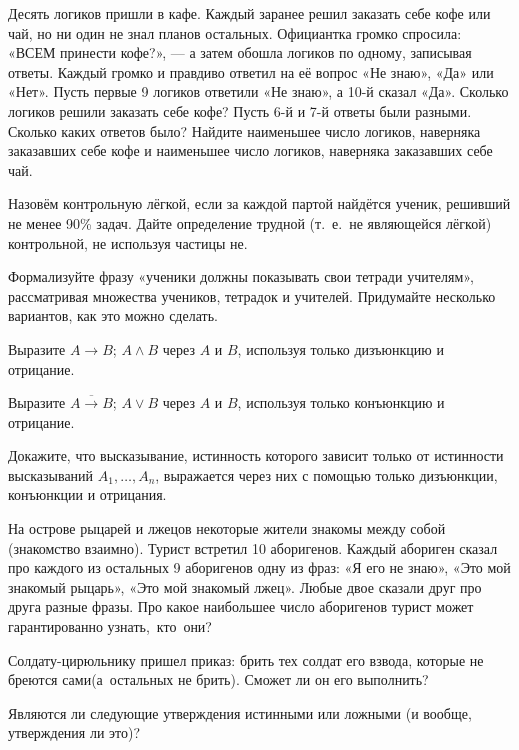 \documentclass[a4paper,11pt]{article}
\newcommand{\0}[1]{\overline{#1}}
\begin{document}
Десять логиков пришли в кафе. Каждый заранее решил заказать себе кофе или чай, но ни один не знал
планов остальных. Официантка громко спросила: «ВСЕМ принести кофе?», --- а затем обошла логиков по одному, записывая ответы.
Каждый громко и правдиво ответил на её вопрос «Не знаю», «Да» или «Нет».
 Пусть первые 9 логиков ответили «Не знаю»,
а 10-й сказал «Да». Сколько логиков решили заказать себе кофе?
 Пусть 6-й и 7-й ответы были разными. Сколько каких ответов было? Найдите наименьшее
число логиков, наверняка заказавших себе кофе и наименьшее число логиков, наверняка заказавших себе чай.

Назов\"ем контрольную л\"егкой, если за каждой партой найд\"ется
ученик, решивший не менее 90\% задач. Дайте определение
трудной (т.~е.~не являющейся л\"егкой) контрольной, не используя
частицы  не.


 Формализуйте фразу «ученики должны показывать свои тетради учителям», рассматривая множества учеников, тетрадок и учителей. Придумайте несколько вариантов, как это можно сделать.

Выразите
$A\to B$;
$A\wedge B$ через $A$ и $B$, используя только дизъюнкцию и отрицание.

Выразите
$\overline{A\to B}$;
$A\vee B$ через $A$ и $B$, используя только конъюнкцию и отрицание.

Докажите, что %
высказывание, истинность которого зависит
только от истинности высказываний $A_1,\dots,A_n$,
выражается через них с помощью %
только дизъюнкции, конъюнкции и отрицания.


На острове рыцарей и лжецов некоторые жители знакомы между собой (знакомство взаимно). Турист встретил 10 аборигенов. Каждый абориген сказал про каждого из остальных 9 аборигенов одну из фраз: «Я его не знаю», «Это мой знакомый рыцарь», «Это мой знакомый лжец». Любые двое сказали друг про друга разные фразы. Про какое наибольшее число аборигенов турист может гарантированно узнать,~кто~они?

Солдату-цирюльнику пришел приказ: брить тех солдат его взвода,
которые не бреются сами\break (а~остальных не брить). Сможет ли он его выполнить?

 Являются ли следующие утверждения истинными или ложными (и вообще, утверждения ли это)?
\begin{center}
\vspace*{-1.7mm}
\hfil
{}
\vspace*{-1mm}
\end{center}
\end{document}
